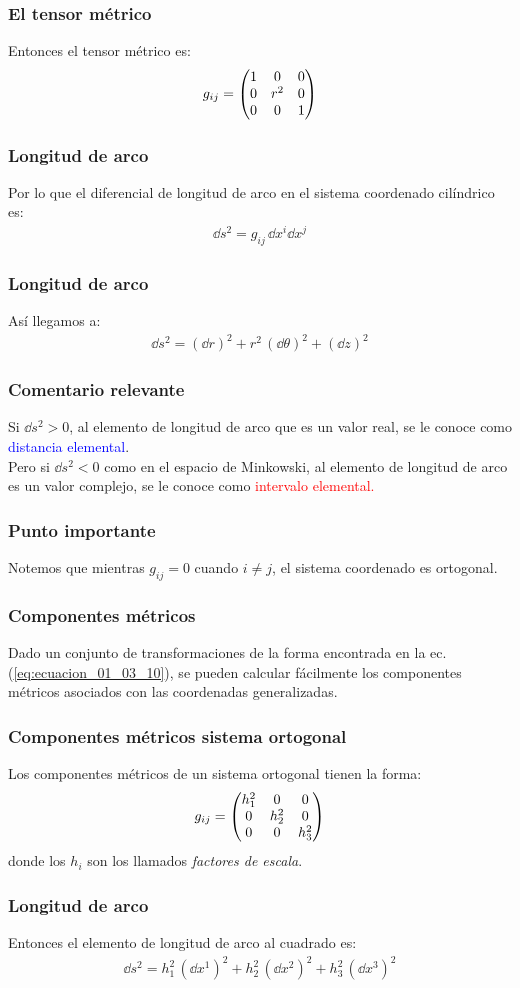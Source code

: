 \documentclass[12pt]{beamer}
\begin{document}
\begin{frame}
\frametitle{El tensor métrico}
Entonces el tensor métrico es:
\pause
\begin{align*}
g_{ij} = \mqty(
1 & 0 & 0 \\
0 & r^{2} & 0 \\
0 & 0 & 1 )
\end{align*}
\end{frame}
\begin{frame}
\frametitle{Longitud de arco}
Por lo que el diferencial de longitud de arco en el sistema coordenado cilíndrico es:
\pause
\begin{align*}
\dd{s}^{2} = g_{ij} \, \dd{x}^{i} \dd{x}^{j}
\end{align*}
\end{frame}  
\begin{frame}
\frametitle{Longitud de arco}
Así llegamos a:
\pause
\begin{align*}
\dd{s}^{2} = (\dd{r})^{2} + r^{2} \, (\dd{\theta})^{2} + (\dd{z})^{2}
\end{align*}
\end{frame}
\begin{frame}
\frametitle{Comentario relevante}
Si $\dd{s}^{2} > 0$, al elemento de longitud de arco que es un valor real, se le conoce como \textcolor{blue}{distancia elemental}.
\\
\bigskip
\pause
Pero si $\dd{s}^{2} < 0$ como en el espacio de Minkowski, al elemento de longitud de arco es un valor complejo, se le conoce como \textcolor{red}{intervalo elemental.}
\end{frame}
\begin{frame}
\frametitle{Punto importante}
Notemos que mientras $g_{ij} = 0$ cuando $i \neq j$, el sistema coordenado es ortogonal.
\end{frame}    
\begin{frame}
\frametitle{Componentes métricos}
Dado un conjunto de transformaciones de la forma encontrada en la ec. (\ref{eq:ecuacion_01_03_10}), se pueden calcular fácilmente los componentes métricos asociados con las coordenadas generalizadas.
\end{frame}
\begin{frame}
\frametitle{Componentes métricos sistema ortogonal}
Los componentes métricos de un sistema ortogonal tienen la forma:
\pause
\begin{align*}
g_{ij} = \mqty(
h_{1}^{2} & 0 & 0 \\
0 & h_{2}^{2} & 0 \\
0 & 0 & h_{3}^{2})
\end{align*}
donde los $h_{i}$ son los llamados \emph{factores de escala}.
\end{frame}
\begin{frame}
\frametitle{Longitud de arco}
Entonces el elemento de longitud de arco al cuadrado es:
\pause
\begin{align*}
\dd{s}^{2} = h_{1}^{2} \, (\dd{x}^{1})^{2} + h_{2}^{2} \, (\dd{x}^{2})^{2} + h_{3}^{2} \, (\dd{x}^{3})^{2}
\end{align*}
\end{frame}
\end{document}
